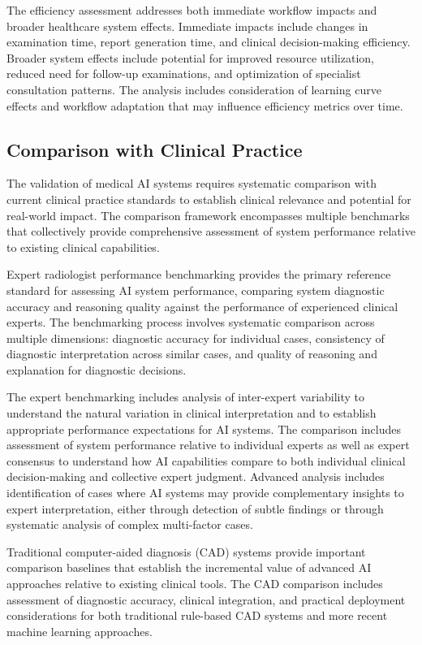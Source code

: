 The efficiency assessment addresses both immediate workflow impacts and broader healthcare system effects. Immediate impacts include changes in examination time, report generation time, and clinical decision-making efficiency. Broader system effects include potential for improved resource utilization, reduced need for follow-up examinations, and optimization of specialist consultation patterns. The analysis includes consideration of learning curve effects and workflow adaptation that may influence efficiency metrics over time.

\subsection{Comparison with Clinical Practice}

The validation of medical AI systems requires systematic comparison with current clinical practice standards to establish clinical relevance and potential for real-world impact. The comparison framework encompasses multiple benchmarks that collectively provide comprehensive assessment of system performance relative to existing clinical capabilities.

Expert radiologist performance benchmarking provides the primary reference standard for assessing AI system performance, comparing system diagnostic accuracy and reasoning quality against the performance of experienced clinical experts. The benchmarking process involves systematic comparison across multiple dimensions: diagnostic accuracy for individual cases, consistency of diagnostic interpretation across similar cases, and quality of reasoning and explanation for diagnostic decisions.

The expert benchmarking includes analysis of inter-expert variability to understand the natural variation in clinical interpretation and to establish appropriate performance expectations for AI systems. The comparison includes assessment of system performance relative to individual experts as well as expert consensus to understand how AI capabilities compare to both individual clinical decision-making and collective expert judgment. Advanced analysis includes identification of cases where AI systems may provide complementary insights to expert interpretation, either through detection of subtle findings or through systematic analysis of complex multi-factor cases.

Traditional computer-aided diagnosis (CAD) systems provide important comparison baselines that establish the incremental value of advanced AI approaches relative to existing clinical tools. The CAD comparison includes assessment of diagnostic accuracy, clinical integration, and practical deployment considerations for both traditional rule-based CAD systems and more recent machine learning approaches.

